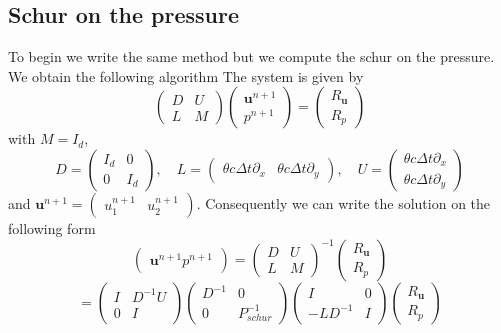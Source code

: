 \documentclass[a4paper,twoside,french,english,11pt]{article}
\newcommand{\dy}{\partial_y}
\newcommand{\dx}{\partial_x}
\newcommand{\ds}{\displaystyle}
\begin{document}
\subsection{Schur on the pressure}
To begin we write the same method but we compute the schur on the pressure. We obtain the following algorithm
The system is given by 
$$
\left(\begin{array}{ll} 
D  & U \\
 L & M\end{array}\right)\left(\begin{array}{l} 
 \mathbf{u}^{n+1}\\
 p^{n+1} \end{array}\right)=\left(\begin{array}{l} 
 R_\mathbf{u}\\
 R_p \end{array}\right)
 $$
with $M=I_d$,
 $$
 D=\left(\begin{array}{ll} 
I_d  & 0 \\
 0 & I_d\end{array}\right),\quad
  L=\left(\begin{array}{ll} 
\ds\theta c\Delta t  \dx  & \ds\theta c\Delta t  \dy \end{array}\right),\quad
  U=\left(\begin{array}{l} 
\ds  \theta c \Delta t  \dx  \\
\ds \theta c \Delta t\dy \end{array}\right)
 $$
 and $\ds \mathbf{u}^{n+1}=\left(\begin{array}{ll} 
u_1^{n+1}  & u_2^{n+1} \end{array}\right)$. 
Consequently we can write the solution on the following form
$$
\left(\begin{array}{l} 
 \mathbf{u}^{n+1}
 p^{n+1} \end{array}\right) =\left(\begin{array}{ll}
D & U  \\
L & M\end{array}\right)^{-1}\left(\begin{array}{l} 
 R_\mathbf{u}\\
 R_p \end{array}\right)
$$
$$
=\left(\begin{array}{ll}
I & D^{-1} U  \\
0 & I\end{array}\right)\left(\begin{array}{ll}
D^{-1} & 0  \\
0 & P_{schur}^{-1}\end{array}\right)\left(\begin{array}{ll}
I & 0  \\
-LD^{-1} & I\end{array}\right)\left(\begin{array}{l} 
 R_\mathbf{u}\\
 R_p\end{array}\right)
 $$
\end{document}
